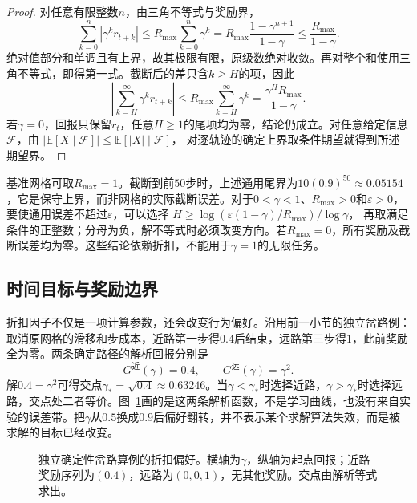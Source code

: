 \begin{proof}
  对任意有限整数$n$，由三角不等式与奖励界，
  \[
    \sum_{k=0}^{n}\left|\gamma^k r_{t+k}\right|
      \leq R_{\max}\sum_{k=0}^{n}\gamma^k
      =R_{\max}\frac{1-\gamma^{n+1}}{1-\gamma}
      \leq\frac{R_{\max}}{1-\gamma}.
  \]
  绝对值部分和单调且有上界，故其极限有限，原级数绝对收敛。再对整个和使用三角不等式，即得第一式。截断后的差只含$k\geq H$的项，因此
  \[
    \left|\sum_{k=H}^{\infty}\gamma^k r_{t+k}\right|
    \leq R_{\max}\sum_{k=H}^{\infty}\gamma^k
    =\frac{\gamma^H R_{\max}}{1-\gamma}.
  \]
  若$\gamma=0$，回报只保留$r_t$，任意$H\geq1$的尾项均为零，结论仍成立。对任意给定信息$\mathcal F$，由
  $|\mathbb E[X\mid\mathcal F]|\leq\mathbb E[|X|\mid\mathcal F]$，
  对逐轨迹的确定上界取条件期望就得到所述期望界。
\end{proof}

基准网格可取$R_{\max}=1$。截断到前$50$步时，上述通用尾界为$10(0.9)^{50}\approx0.05154$，它是保守上界，而非网格的实际截断误差。对于$0<\gamma<1$、$R_{\max}>0$和$\varepsilon>0$，要使通用误差不超过$\varepsilon$，可以选择
$H\geq\log(\varepsilon(1-\gamma)/R_{\max})/\log\gamma$，
再取满足条件的正整数；分母为负，解不等式时必须改变方向。若$R_{\max}=0$，所有奖励及截断误差均为零。这些结论依赖折扣，不能用于$\gamma=1$的无限任务。

\subsection{时间目标与奖励边界}
\label{sec:rl-overview-reward-boundaries}

折扣因子不仅是一项计算参数，还会改变行为偏好。沿用前一小节的独立岔路例：取消原网格的滑移和步成本，近路第一步得$0.4$后结束，远路第三步得$1$，此前奖励全为零。两条确定路径的解析回报分别是
\[
  G^{\text{近}}(\gamma)=0.4,\qquad
  G^{\text{远}}(\gamma)=\gamma^2.
\]
解$0.4=\gamma^2$可得交点$\gamma_*=\sqrt{0.4}\approx0.63246$。当$\gamma<\gamma_*$时选择近路，$\gamma>\gamma_*$时选择远路，交点处二者等价。图~\ref{fig:rl-overview-discount}画的是这两条解析函数，不是学习曲线，也没有来自实验的误差带。把$\gamma$从$0.5$换成$0.9$后偏好翻转，并不表示某个求解算法失效，而是被求解的目标已经改变。

\begin{figure}[htbp]
  \centering
  
  \caption{独立确定性岔路算例的折扣偏好。横轴为$\gamma$，纵轴为起点回报；近路奖励序列为$(0.4)$，远路为$(0,0,1)$，无其他奖励。交点由解析等式求出。}
  \label{fig:rl-overview-discount}
\end{figure}

